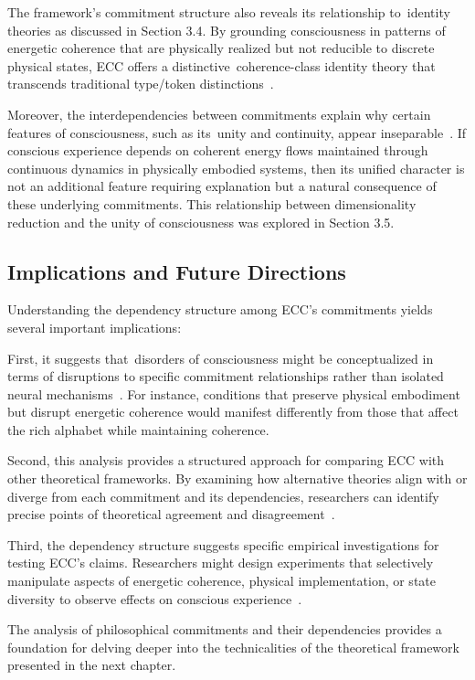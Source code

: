 The framework's commitment structure also reveals its relationship to~identity theories as discussed in Section 3.4. By grounding consciousness in patterns of energetic coherence that are physically realized but not reducible to discrete physical states, ECC offers a distinctive~coherence-class identity theory that transcends traditional type/token distinctions~\cite{levin2020revisiting,breakspear2005dynamics}.

Moreover, the interdependencies between commitments explain why certain features of consciousness, such as its~unity and continuity, appear inseparable~\cite{bayne2010unity,mashour2020conscious}. If conscious experience depends on coherent energy flows maintained through continuous dynamics in physically embodied systems, then its unified character is not an additional feature requiring explanation but a natural consequence of these underlying commitments. This relationship between dimensionality reduction and the unity of consciousness was explored in Section 3.5.

\subsection*{Implications and Future Directions}

Understanding the dependency structure among ECC's commitments yields several important implications:

First, it suggests that~disorders of consciousness might be conceptualized in terms of disruptions to specific commitment relationships rather than isolated neural mechanisms~\cite{bosl2025dynamical,zheng2025unbearable}. For instance, conditions that preserve physical embodiment but disrupt energetic coherence would manifest differently from those that affect the rich alphabet while maintaining coherence.

Second, this analysis provides a structured approach for comparing ECC with other theoretical frameworks. By examining how alternative theories align with or diverge from each commitment and its dependencies, researchers can identify precise points of theoretical agreement and disagreement~\cite{gallagher2020phenomenological,varela1996neurophenomenology}.

Third, the dependency structure suggests specific empirical investigations for testing ECC's claims. Researchers might design experiments that selectively manipulate aspects of energetic coherence, physical implementation, or state diversity to observe effects on conscious experience~\cite{Gidon2020,Beniaguev2021}.

The analysis of philosophical commitments and their dependencies provides a foundation for delving deeper into the technicalities of the theoretical framework presented in the next chapter.
